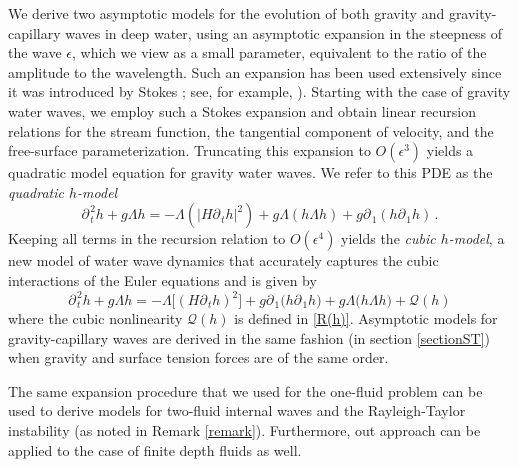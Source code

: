 \documentclass[11pt]{article}
\theoremstyle{plain}
\theoremstyle{definition}
\theoremstyle{definition}
\def\p{\text{\bf\emph{p}}}
\def\p{{\partial\hspace{1pt}}}
\begin{document}
We derive two asymptotic models for the evolution of both gravity and gravity-capillary waves in deep water, using an asymptotic expansion in the steepness of the wave $ \epsilon $,  which we view as a small parameter, equivalent  to the ratio of the amplitude to the wavelength.  Such an expansion  has been used extensively since it was introduced by Stokes \cite{stokes1847theory}; see, for example, \cite{AkNi2010, NiRe2005, NiRe2006, AkNi2012, AkNi2014}).
Starting with the case of gravity water waves,  we employ such a  Stokes expansion and obtain  linear recursion relations for the stream function,
the tangential  component of velocity, and the free-surface parameterization. Truncating  this expansion to $O( \epsilon ^3)$ yields a quadratic model equation for  gravity water waves. We refer to this PDE as the \emph{quadratic $h$-model}
\begin{equation}
\p_{\!t}^2 h + g \Lambda h = - \Lambda (|H \p_{\!t}h|^2) + g \Lambda (h \Lambda h) + g \p_{\!1} (h \p_{\!1} h)\,.
\end{equation} 
Keeping
all terms in the recursion relation to  $O( \epsilon ^4)$ yields  the \emph{cubic $h$-model}, a new model of  water wave dynamics that accurately captures the cubic interactions of the Euler equations and is given by
\begin{equation}
\p_{\!t}^2 h + g \Lambda h = -\Lambda \big[(H\p_{\!t} h)^2\big] + g \p_{\!1} \big(h \p_{\!1} h \big) +g\Lambda \big(h \Lambda h \big)+ \mathcal{Q}(h)
\end{equation}
where the cubic nonlinearity $\mathcal{Q}(h)$ is defined  in \eqref{R(h)}.   Asymptotic models for  gravity-capillary waves are derived in the same fashion (in section \ref{sectionST}) when
 gravity and surface tension forces are of the same order.



The same expansion procedure that we used for  the one-fluid problem can be used to derive 
 models for two-fluid internal waves and
 the Rayleigh-Taylor instability (as noted in Remark \ref{remark}). Furthermore, out approach can be applied to the case of finite depth fluids as well.
 
\end{document}
